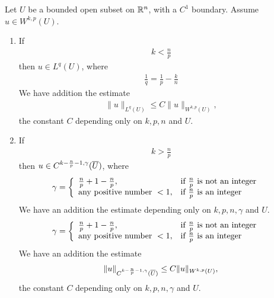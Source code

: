 \documentclass[12pt,a4paper]{report}
\begin{document}
\begin{description}
	Let $U$ be a bounded open subset on $\mathbb{R}^n$, with a $C^1$ boundary.  Assume $u \in W^{k,p}(U)$.
	\begin{enumerate}[label=(\roman*)]
		\item If 
		\begin{align*}
			k < \frac{n}{p}
\end{align*}	 then $u \in L^q(U)$, where
\begin{align*}
	\frac{1}{q}= \frac{1}{p}-\frac{k}{n}
\end{align*}We have addition the estimate
\begin{align*}
	\|u\|_{L^q(U)} \le C \|u\|_{W^{k,p}(U)},
\end{align*}the constant $C$ depending only on $k,p,n$ and $U$.
		\item If
		\begin{align*}
			k > \frac{n}{p}
		\end{align*}then $u \in C^{k-\frac{n}{p}-1,\gamma}(\overline{U})$, where
		\begin{align*}
			\gamma &= \left \{ \begin{array}{ll} \frac{n}{p}+1-\frac{n}{p}, & \text{if $\frac{n}{p}$ is not an integer}\\ \text{any positive number } < 1, &\text{if $\frac{n}{p}$ is an integer} \end{array} \right .
		\end{align*}We have an addition the estimate
depending only on $k,p,n,\gamma$ and $U$.
		\begin{align*}
			\gamma &= \left \{ \begin{array}{ll} \frac{n}{p}+1-\frac{n}{p}, & \text{if $\frac{n}{p}$ is not an integer}\\ \text{any positive number } < 1, &\text{if $\frac{n}{p}$ is an integer} \end{array} \right .
		\end{align*}We have an addition the estimate
		\begin{align*}
			\|u\|_{C^{k-\frac{n}{p}-1,\gamma}(\overline{U})} \le C\|u\|_{W^{k,p}(U)},
		\end{align*}the constant $C$ depending only on $k,p,n,\gamma$ and $U$.
	\end{enumerate}
	
\end{description}
\end{document}
